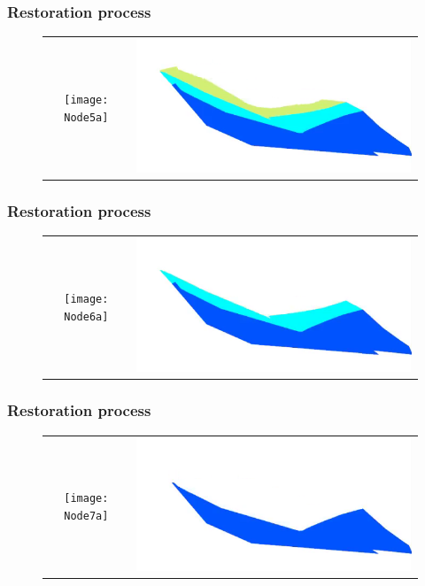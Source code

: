 \documentclass{beamer}
\begin{document}
	\begin{frame}
	\frametitle{Restoration process}
	\begin{figure}[H]
	\centering
	\begin{tabular}{@{}cc@{}}
	\texttt{[image: Node5a]}&
	\includegraphics[width=.65\textwidth]{chartreusedroite7.png}\\
	\end{tabular}
	\end{figure}
	\end{frame}
	
	\begin{frame}
	\frametitle{Restoration process}
	\begin{figure}[H]
	\centering
	\begin{tabular}{@{}cc@{}}
	\texttt{[image: Node6a]}&
	\includegraphics[width=.65\textwidth]{chartreusedroite8.png}\\
	\end{tabular}
	\end{figure}
	\end{frame}
		\begin{frame}
	\frametitle{Restoration process}
	\begin{figure}[H]
	\centering
	\begin{tabular}{@{}cc@{}}
	\texttt{[image: Node7a]}&
	\includegraphics[width=.65\textwidth]{chartreusedroite9.png}\\
	\end{tabular}
	\end{figure}
	\end{frame}
	
\end{document}
